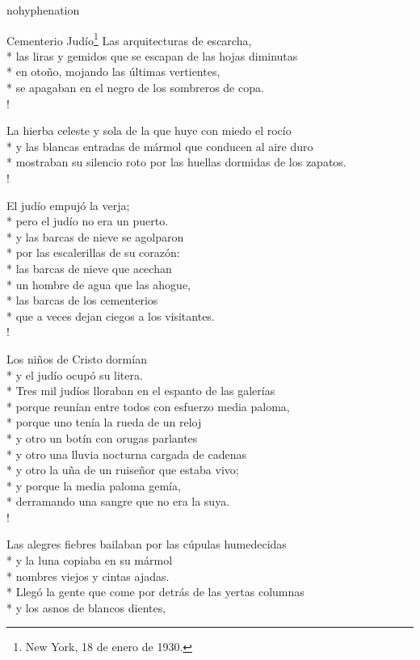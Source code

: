\documentclass[
    a5paper,
    DIV=10,
    12pt,
    notitlepage,
    oneside,]
{scrbook} %
\begin{document}
\begin{hyphenrules}{nohyphenation}
\begin{poem}{Cementerio Judío}{\footnote{New York, 18 de enero de 1930.}}{\vspace{-1em}}
Las arquitecturas de escarcha,\\*
las liras y gemidos que se escapan de las hojas diminutas\\*
en otoño, mojando las últimas vertientes,\\*
se apagaban en el negro de los sombreros de copa.\\!

La hierba celeste y sola de la que huye con miedo el rocío\\*
y las blancas entradas de mármol que conducen al aire duro\\*
mostraban su silencio roto por las huellas dormidas de los zapatos.\\!

El judío empujó la verja;\\*
pero el judío no era un puerto.\\*
y las barcas de nieve se agolparon\\*
por las escalerillas de su corazón:\\*
las barcas de nieve que acechan\\*
un hombre de agua que las ahogue,\\*
las barcas de los cementerios\\*
que a veces dejan ciegos a los visitantes.\\!

Los niños de Cristo dormían\\*
y el judío ocupó su litera.\\*
Tres mil judíos lloraban en el espanto de las galerías\\*
porque reunían entre todos con esfuerzo media paloma,\\*
porque uno tenía la rueda de un reloj\\*
y otro un botín con orugas parlantes\\*
y otro una lluvia nocturna cargada de cadenas\\*
y otro la uña de un ruiseñor que estaba vivo;\\*
y porque la media paloma gemía,\\*
derramando una sangre que no era la suya.\\!

Las alegres fiebres bailaban por las cúpulas humedecidas\\*
y la luna copiaba en su mármol\\*
nombres viejos y cintas ajadas.\\*
Llegó la gente que come por detrás de las yertas columnas\\*
y los asnos de blancos dientes,\\


\end{poem}
\end{hyphenrules}
\end{document}
